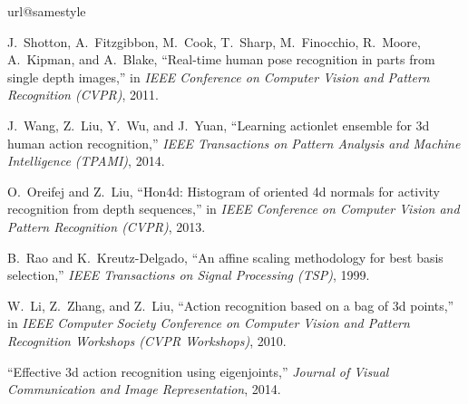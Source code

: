 \documentclass[9pt,technote,compsoc]{IEEEtran}
\begin{document}
\ifCLASSOPTIONcaptionsoff
  \newpage
\fi







\begin{thebibliography}{10}
	\providecommand{\url}[1]{#1}
	\csname url@samestyle\endcsname
	\providecommand{\newblock}{\relax}
	\providecommand{\bibinfo}[2]{#2}
	\providecommand{\BIBentrySTDinterwordspacing}{\spaceskip=0pt\relax}
	\providecommand{\BIBentryALTinterwordstretchfactor}{4}
	\providecommand{\BIBentryALTinterwordspacing}{\spaceskip=\fontdimen2\font plus
		\BIBentryALTinterwordstretchfactor\fontdimen3\font minus
		\fontdimen4\font\relax}
	\providecommand{\BIBforeignlanguage}[2]{{\expandafter\ifx\csname l@#1\endcsname\relax
			\typeout{** WARNING: IEEEtran.bst: No hyphenation pattern has been}\typeout{** loaded for the language `#1'. Using the pattern for}\typeout{** the default language instead.}\else
			\language=\csname l@#1\endcsname
			\fi
			#2}}
	\providecommand{\BIBdecl}{\relax}
	\BIBdecl
	
	J.~Shotton, A.~Fitzgibbon, M.~Cook, T.~Sharp, M.~Finocchio, R.~Moore,
	A.~Kipman, and A.~Blake, ``Real-time human pose recognition in parts from
	single depth images,'' in \emph{IEEE Conference on Computer Vision and
		Pattern Recognition (CVPR)}, 2011.
	
	J.~Wang, Z.~Liu, Y.~Wu, and J.~Yuan, ``Learning actionlet ensemble for 3d human
	action recognition,'' \emph{IEEE Transactions on Pattern Analysis and Machine
		Intelligence (TPAMI)}, 2014.
	
	O.~Oreifej and Z.~Liu, ``Hon4d: Histogram of oriented 4d normals for activity
	recognition from depth sequences,'' in \emph{IEEE Conference on Computer
		Vision and Pattern Recognition (CVPR)}, 2013.
	
	B.~Rao and K.~Kreutz-Delgado, ``An affine scaling methodology for best basis
	selection,'' \emph{IEEE Transactions on Signal Processing (TSP)}, 1999.
	
	W.~Li, Z.~Zhang, and Z.~Liu, ``Action recognition based on a bag of 3d
	points,'' in \emph{IEEE Computer Society Conference on Computer Vision and
		Pattern Recognition Workshops (CVPR Workshops)}, 2010.
	
	``Effective 3d action recognition using eigenjoints,'' \emph{Journal of Visual
		Communication and Image Representation}, 2014.
	

\end{thebibliography}
\end{document}
